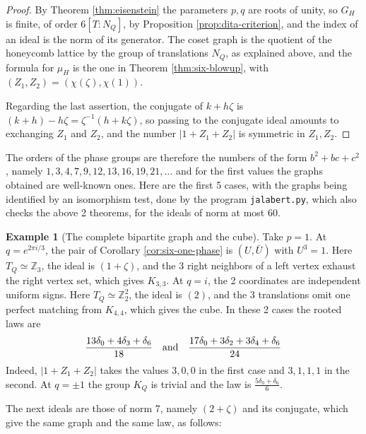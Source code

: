 \documentclass[11pt,reqno]{amsart}
\theoremstyle{definition}
\newtheorem{example}[thm]{Example}
\numberwithin{equation}{section}
\begin{document}
\begin{proof}
By Theorem \ref{thm:eisenstein} the parameters $p,q$ are roots of unity, so $G_H$ is finite, of order $6[T:N_Q]$, by Proposition \ref{prop:dita-criterion}, and the index of an ideal is the norm of its generator. The coset graph is the quotient of the honeycomb lattice by the group of translations $N_Q$, as explained above, and the formula for $\mu_H$ is the one in Theorem \ref{thm:six-blowup}, with $(Z_1,Z_2)=(\chi(\zeta),\chi(1))$.

Regarding the last assertion, the conjugate of $k+h\zeta$ is $(k+h)-h\zeta=\zeta^{-1}(h+k\zeta)$, so passing to the conjugate ideal amounts to exchanging $Z_1$ and $Z_2$, and the number $|1+Z_1+Z_2|$ is symmetric in $Z_1,Z_2$.
\end{proof}

The orders of the phase groups are therefore the numbers of the form $b^2+bc+c^2$, namely $1,3,4,7,9,12,13,16,19,21,\ldots$ and for the first values the graphs obtained are well-known ones. Here are the first 5 cases, with the graphs being identified by an isomorphism test, done by the program \texttt{jalabert.py}, which also checks the above 2 theorems, for the ideals of norm at most 60.

\begin{example}[The complete bipartite graph and the cube]\label{ex:six-cube}
Take $p=1$. At $q=e^{2\pi i/3}$, the pair of Corollary \ref{cor:six-one-phase} is $(U,\bar U)$ with $U^3=1$. Here $T_Q\simeq\mathbb Z_3$, the ideal is $(1+\zeta)$, and the 3 right neighbors of a left vertex exhaust the right vertex set, which gives $K_{3,3}$. At $q=i$, the 2 coordinates are independent uniform signs. Here $T_Q\simeq\mathbb Z_2^2$, the ideal is $(2)$, and the 3 translations omit one perfect matching from $K_{4,4}$, which gives the cube. In these 2 cases the rooted laws are
$$\frac{13\delta_0+4\delta_3+\delta_6}{18}
\quad{\rm and}\quad
\frac{17\delta_0+3\delta_2+3\delta_4+\delta_6}{24}$$
Indeed, $|1+Z_1+Z_2|$ takes the values $3,0,0$ in the first case and $3,1,1,1$ in the second. At $q=\pm1$ the group $K_Q$ is trivial and the law is $\frac{5\delta_0+\delta_6}6$.
\end{example}

The next ideals are those of norm 7, namely $(2+\zeta)$ and its conjugate, which give the same graph and the same law, as follows:
\end{document}
